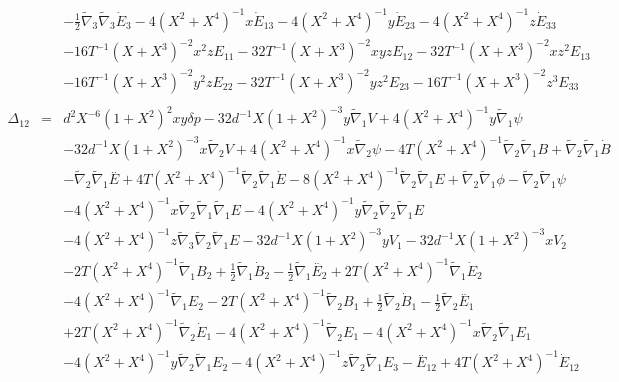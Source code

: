 \documentclass[10pt,letterpaper]{article}
\numberwithin{equation}{section}
\begin{document}
\begin{appendices}
\begin{eqnarray}
&& -  \tfrac{1}{2} \tilde{\nabla}_{3}\tilde{\nabla}_{3}\dot{E}_{3}-4 (X^2 + X^4)^{-1} x \dot{E}_{13} - 4 (X^2 + X^4)^{-1} y \dot{E}_{23} - 4 (X^2 + X^4)^{-1} z \dot{E}_{33} \nonumber \\ 
&& - 16 T^{-1} (X + X^3)^{-2} x^2 z E_{11} - 32 T^{-1} (X + X^3)^{-2} x y z E_{12} - 32 T^{-1} (X + X^3)^{-2} x z^2 E_{13} \nonumber \\ 
&& - 16 T^{-1} (X + X^3)^{-2} y^2 z E_{22} - 32 T^{-1} (X + X^3)^{-2} y z^2 E_{23} - 16 T^{-1} (X + X^3)^{-2} z^3 E_{33}
\\  \nonumber\\ 
\Delta_{12}&=& d^2 X^{-6} (1 + X^2)^2 x y \delta p - 32 d^{-1} X (1 + X^2)^{-3} y \tilde{\nabla}_{1}V + 4 (X^2 + X^4)^{-1} y \tilde{\nabla}_{1}\psi \nonumber \\ 
&& - 32 d^{-1} X (1 + X^2)^{-3} x \tilde{\nabla}_{2}V + 4 (X^2 + X^4)^{-1} x \tilde{\nabla}_{2}\psi - 4 T (X^2 + X^4)^{-1} \tilde{\nabla}_{2}\tilde{\nabla}_{1}B + \tilde{\nabla}_{2}\tilde{\nabla}_{1}\dot{B} \nonumber \\ 
&& -  \tilde{\nabla}_{2}\tilde{\nabla}_{1}\overset{..}{E} + 4 T (X^2 + X^4)^{-1} \tilde{\nabla}_{2}\tilde{\nabla}_{1}\dot{E} - 8 (X^2 + X^4)^{-1} \tilde{\nabla}_{2}\tilde{\nabla}_{1}E + \tilde{\nabla}_{2}\tilde{\nabla}_{1}\phi -  \tilde{\nabla}_{2}\tilde{\nabla}_{1}\psi \nonumber \\ 
&& - 4 (X^2 + X^4)^{-1} x \tilde{\nabla}_{2}\tilde{\nabla}_{1}\tilde{\nabla}_{1}E - 4 (X^2 + X^4)^{-1} y \tilde{\nabla}_{2}\tilde{\nabla}_{2}\tilde{\nabla}_{1}E \nonumber \\ 
&& - 4 (X^2 + X^4)^{-1} z \tilde{\nabla}_{3}\tilde{\nabla}_{2}\tilde{\nabla}_{1}E-32 d^{-1} X (1 + X^2)^{-3} y V_{1} - 32 d^{-1} X (1 + X^2)^{-3} x V_{2} \nonumber \\ 
&& - 2 T (X^2 + X^4)^{-1} \tilde{\nabla}_{1}B_{2} + \tfrac{1}{2} \tilde{\nabla}_{1}\dot{B}_{2} -  \tfrac{1}{2} \tilde{\nabla}_{1}\overset{..}{E}_{2} + 2 T (X^2 + X^4)^{-1} \tilde{\nabla}_{1}\dot{E}_{2} \nonumber \\ 
&& - 4 (X^2 + X^4)^{-1} \tilde{\nabla}_{1}E_{2} - 2 T (X^2 + X^4)^{-1} \tilde{\nabla}_{2}B_{1} + \tfrac{1}{2} \tilde{\nabla}_{2}\dot{B}_{1} -  \tfrac{1}{2} \tilde{\nabla}_{2}\overset{..}{E}_{1} \nonumber \\ 
&& + 2 T (X^2 + X^4)^{-1} \tilde{\nabla}_{2}\dot{E}_{1} - 4 (X^2 + X^4)^{-1} \tilde{\nabla}_{2}E_{1} - 4 (X^2 + X^4)^{-1} x \tilde{\nabla}_{2}\tilde{\nabla}_{1}E_{1} \nonumber \\ 
&& - 4 (X^2 + X^4)^{-1} y \tilde{\nabla}_{2}\tilde{\nabla}_{1}E_{2} - 4 (X^2 + X^4)^{-1} z \tilde{\nabla}_{2}\tilde{\nabla}_{1}E_{3}- \overset{..}{E}_{12} + 4 T (X^2 + X^4)^{-1} \dot{E}_{12} \nonumber \\ 

\end{eqnarray}
\end{appendices}
\end{document}
